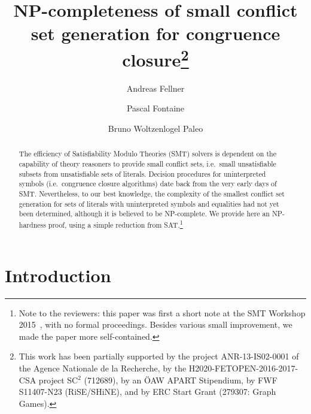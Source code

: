 \documentclass[smallextended]{svjour3}
\title{NP-completeness of small conflict set generation for congruence closure\thanks{This work has been partially supported by the project ANR-13-IS02-0001 of the Agence Nationale de la Recherche, by the H2020-FETOPEN-2016-2017-CSA project SC$^2$ (712689), by an ÖAW APART Stipendium, by FWF S11407-N23 (RiSE/SHiNE), and by ERC Start Grant (279307: Graph Games).}}
\author{Andreas Fellner%
   \and Pascal Fontaine%
   \and Bruno Woltzenlogel Paleo%
}
\institute{
A. Fellner \at
  Austrian Institute of Technology and
  Vienna University of Technology (Austria)
\and
P. Fontaine \at
  Inria, Loria, U. of Lorraine (France)
\and
B. Woltzenlogel Paleo \at
  Australian National University (Australia)
}
\begin{document}
\maketitle

\begin{abstract}
The efficiency of Satisfiability Modulo Theories (SMT) solvers is dependent on the capability of theory reasoners to provide small conflict sets, i.e.\ small unsatisfiable subsets from unsatisfiable sets of literals.  Decision procedures for uninterpreted symbols (i.e.\ congruence closure algorithms) date back from the very early days of SMT.  Nevertheless, to our best knowledge, the complexity of the smallest conflict set generation for sets of literals with uninterpreted symbols and equalities had not yet been determined, although it is believed to be NP-complete.  We provide here an NP-hardness proof, using a simple reduction from SAT.\footnote{Note to the reviewers: this paper was first a short note at the SMT Workshop 2015~\cite{Fellner1}, with no formal proceedings.  Besides various small improvement, we made the paper more self-contained.}
\end{abstract}


\section{Introduction}
\end{document}
